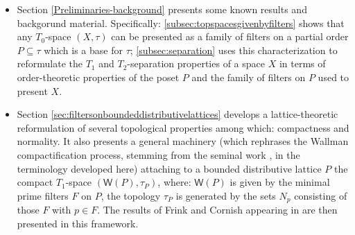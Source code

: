 \documentclass{article}
\theoremstyle{plain}
\theoremstyle{definition}
\theoremstyle{remark}
\newcommand{\bool}[1]{\mathsf{#1}}
\newcommand{\0}{\mathbbm 0}
\newcommand{\1}{\mathbbm 1}
\newcommand{\2}{\mathbbm 2}
\begin{document}
\begin{itemize}
\item  Section \ref{Preliminaries-background} presents some known results and backgorund material. Specifically:
\ref{subsec:topspacesgivenbyfilters}
shows that any $T_0$-space $(X,\tau)$ can be presented as a family of filters on a partial order $P\subseteq \tau$ which is a base for $\tau$;
\ref{subsec:separation}
uses this characterization to reformulate the $T_1$ and $T_2$-separation properties of a space $X$ in terms of order-theoretic properties of the poset $P$ and the family of filters on $P$ used to present $X$.

\item Section \ref{sec:filtersonboundeddistributivelattices} develops a lattice-theoretic reformulation of several topological properties among which: compactness and normality.
It also presents a general machinery (which rephrases the Wallman compactification process, stemming from the seminal work \cite{WallmanComp37}, in the terminology developed here) attaching to a bounded distributive lattice $P$ the compact $T_1$-space $(\bool{W}(P),\tau_P)$, where: $\bool{W}(P)$ is given by the minimal prime filters $F$ on $P$, the topology $\tau_P$ is generated by the sets $N_p$ consisting of those $F$ with $p\in F$. The results of Frink and Cornish appearing in \cite{Cornish1972NormalL,frink} are then presented in this framework.


\end{itemize}
\end{document}
